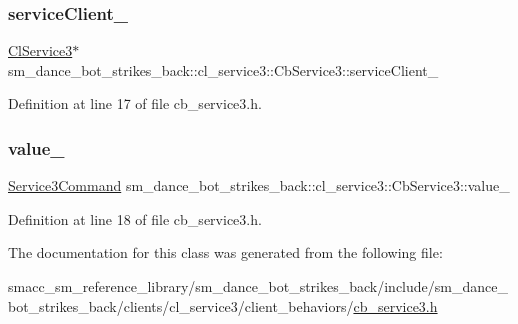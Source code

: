 \subsubsection{\texorpdfstring{service\+Client\+\_\+}{serviceClient\_}}
{\footnotesize\ttfamily \hyperlink{classsm__dance__bot__strikes__back_1_1cl__service3_1_1ClService3}{Cl\+Service3}$\ast$ sm\+\_\+dance\+\_\+bot\+\_\+strikes\+\_\+back\+::cl\+\_\+service3\+::\+Cb\+Service3\+::service\+Client\+\_\+\hspace{0.3cm}{\ttfamily [private]}}



Definition at line 17 of file cb\+\_\+service3.\+h.

\mbox{\label{classsm__dance__bot__strikes__back_1_1cl__service3_1_1CbService3_a76973df60e0e3ed7d7c270d0701b8f9d}} 
\subsubsection{\texorpdfstring{value\+\_\+}{value\_}}
{\footnotesize\ttfamily \hyperlink{namespacesm__dance__bot__strikes__back_1_1cl__service3_ac2ccf5d911840620cf8d0443c29d8b6b}{Service3\+Command} sm\+\_\+dance\+\_\+bot\+\_\+strikes\+\_\+back\+::cl\+\_\+service3\+::\+Cb\+Service3\+::value\+\_\+\hspace{0.3cm}{\ttfamily [private]}}



Definition at line 18 of file cb\+\_\+service3.\+h.



The documentation for this class was generated from the following file\+:\begin{DoxyCompactItemize}
\item 
smacc\+\_\+sm\+\_\+reference\+\_\+library/sm\+\_\+dance\+\_\+bot\+\_\+strikes\+\_\+back/include/sm\+\_\+dance\+\_\+bot\+\_\+strikes\+\_\+back/clients/cl\+\_\+service3/client\+\_\+behaviors/\hyperlink{sm__dance__bot__strikes__back_2include_2sm__dance__bot__strikes__back_2clients_2cl__service3_2cl02b338556f624dc0562821c4ed36e789}{cb\+\_\+service3.\+h}\end{DoxyCompactItemize}
